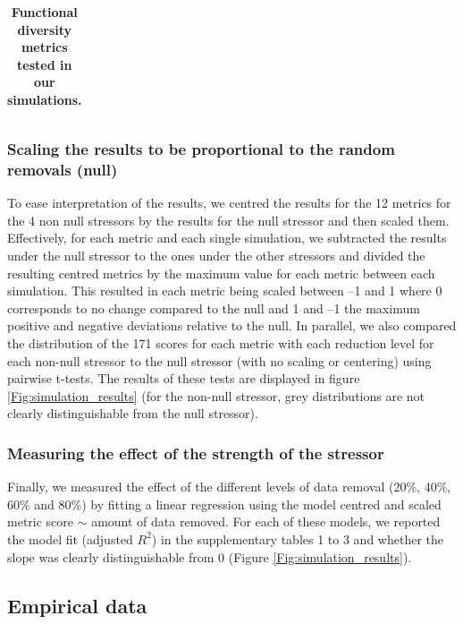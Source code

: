 \documentclass[12pt,letterpaper]{article}
\begin{document}
\begin{table}
\begin{tabular}{p{0.1\linewidth}|p{0.15\linewidth}|p{0.15\linewidth}|p{0.2\linewidth}|p{0.15\linewidth}|p{0.1\linewidth}}
\end{tabular}
\caption{\scriptsize{\textbf{Functional diversity metrics tested in our simulations.}}
}
\label{Tab:metrics}
\end{table}

\subsubsection{Scaling the results to be proportional to the random removals (null)}

To ease interpretation of the results, we centred the results for the 12 metrics for the 4 non null stressors by the results for the null stressor and then scaled them.
Effectively, for each metric and each single simulation, we subtracted the results under the null stressor to the ones under the other stressors and divided the resulting centred metrics by the maximum value for each metric between each simulation.
This resulted in each metric being scaled between –1 and 1 where 0 corresponds to no change compared to the null and 1 and –1 the maximum positive and negative deviations relative to the null.
In parallel, we also compared the distribution of the 171 scores for each metric with each reduction level for each non-null stressor to the null stressor (with no scaling or centering) using pairwise t-tests.
The results of these tests are displayed in figure \ref{Fig:simulation_results} (for the non-null stressor, grey distributions are not clearly distinguishable from the null stressor).

\subsubsection{Measuring the effect of the strength of the stressor}

Finally, we measured the effect of the different levels of data removal (20\%, 40\%, 60\% and 80\%) by fitting a linear regression using the model centred and scaled metric score $\sim$ amount of data removed.
For each of these models, we reported the model fit (adjusted $R^2$) in the supplementary tables 1 to 3 and whether the slope was clearly distinguishable from 0 (Figure \ref{Fig:simulation_results}).

\subsection{Empirical data}
\end{document}
